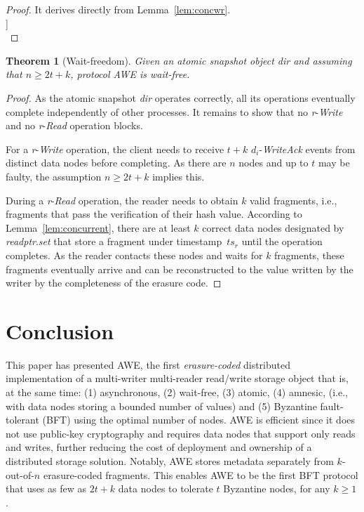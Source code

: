 \documentclass[oribibl]{llncs}
\newtheorem{theorem}{Theorem}
\theoremstyle{definition-boldhead}
\newcommand{\var}[1]{\textit{#1}}
\newcommand{\op}[1]{\textsl{#1}}
\newcommand{\dir}{\var{dir}\xspace}
\newcommand{\NAME}{AWE\xspace}
\newcommand{\nodes}{nodes\xspace}
\providecommand{\note}[1]{}
\renewcommand{\note}[1]{[[\textsf{\bf #1}]]}
\begin{document}
\begin{proof}
It derives directly from Lemma~\ref{lem:concwr}.\\
\note{E: Is there a simple way to do this?}\\
\end{proof}

\fi



\if\submit\no
\begin{theorem}[Wait-freedom]\label{thm:waitfree}
  Given an atomic snapshot object \dir and assuming that $n \geq
  2t+k$, protocol \NAME is wait-free.
\end{theorem}

\begin{proof}
  As the atomic snapshot \dir operates correctly, all its operations
  eventually complete independently of other processes. It remains to
  show that no \var{r}-\op{Write} and no \var{r}-\op{Read} operation
  blocks.

  For a \var{r}-\op{Write} operation, the client needs to receive $t +
  k$ \var{$d_i$}-\op{WriteAck} events from distinct data \nodes
  before completing.  As there are $n$ \nodes and up to $t$ may be
  faulty, the assumption $n \geq 2t + k$ implies this.

  During a \var{r}-\op{Read} operation, the reader needs to obtain $k$
  valid fragments, i.e., fragments that pass the verification of their
  hash value.  According to Lemma~\ref{lem:concurrent}, there are at
  least $k$ correct data \nodes designated by
  \var{readptr}.\var{set} that store a fragment under
  timestamp~$\var{ts}_r$ until the operation completes.  As the reader
  contacts these \nodes and waits for $k$ fragments, these fragments
  eventually arrive and can be reconstructed to the value written by
  the writer by the completeness of the erasure code.
\end{proof}
\fi





\if\submit\no
\section{Conclusion}

This paper has presented \NAME, the first \emph{erasure-coded}
distributed implementation of a multi-writer multi-reader read/write
storage object that is, at the same time: (1) asynchronous, (2)
wait-free, (3) atomic, (4) amnesic, (i.e., with data \nodes storing a
bounded number of values) and (5) Byzantine fault-tolerant (BFT) using
the optimal number of \nodes. \NAME is efficient since it does not use
public-key cryptography and requires data \nodes that support only
reads and writes, further reducing the cost of deployment and
ownership of a distributed storage solution. Notably, \NAME stores
metadata separately from $k$-out-of-$n$ erasure-coded fragments. This
enables \NAME to be the first BFT protocol that uses as few as $2t+k$
data \nodes to tolerate $t$ Byzantine \nodes, for any $k\ge 1$.
\end{document}
